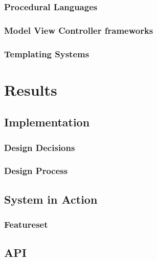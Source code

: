 \documentclass[a4paper,12pt]{report}
\begin{document}
\subsection*{Procedural Languages}

\subsection*{Model View Controller frameworks}

\subsection{Templating Systems}

\chapter{Results}

\section{Implementation}

\subsection*{Design Decisions}

\subsection*{Design Process}


\section{System in Action}

\subsection{Featureset}

\section{API}
\end{document}
